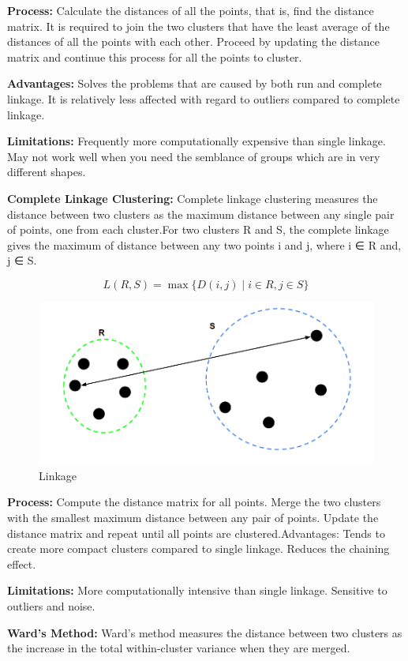 \documentclass[conference]{IEEEtran}
\begin{document}
\textbf{Process:} Calculate the distances of all the points, that is, find the distance matrix.
It is required to join the two clusters that have the least average of the distances of all the points with each other. Proceed by updating the distance matrix and continue this process for all the points to cluster.

\textbf{Advantages:} Solves the problems that are caused by both run and complete linkage. It is relatively less affected with regard to outliers compared to complete linkage.   

\textbf{Limitations:} Frequently more computationally expensive than single linkage. May not work well when you need the semblance of groups which are in very different shapes.

\textbf{Complete Linkage Clustering:}
Complete linkage clustering measures the distance between two clusters as the maximum distance between any single pair of points, one from each cluster.For two clusters R and S, the complete linkage gives the maximum of distance between any two points i and j, where i ∈ R and, j ∈ S.\cite{xu2005survey}

\begin{equation}
L(R,S) = \max \{ D(i,j) \mid i \in R, j \in S \}
\end{equation}

\begin{figure}[H]
\centering
\includegraphics[width=.4\textwidth]{complete linkage.png}
\caption{Linkage\cite{Linkage}}
\label{DPE}
\end{figure}

\textbf{Process:}
Compute the distance matrix for all points.
Merge the two clusters with the smallest maximum distance between any pair of points.
Update the distance matrix and repeat until all points are clustered.Advantages:
Tends to create more compact clusters compared to single linkage.
Reduces the chaining effect.

\textbf{Limitations:}
More computationally intensive than single linkage.
Sensitive to outliers and noise.

\textbf{Ward’s Method:}
Ward’s method measures the distance between two clusters as the increase in the total within-cluster variance when they are merged.\cite{xu2005survey}
\end{document}
